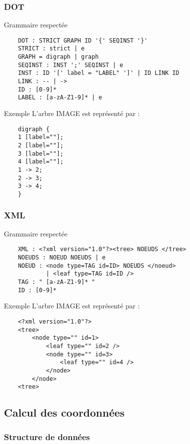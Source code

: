 \begin{frame}
    \frametitle{DOT}
    \begin{block}{Grammaire respectée}
    \begin{verbatim}
    DOT : STRICT GRAPH ID '{' SEQINST '}'
    STRICT : strict | e
    GRAPH = digraph | graph
    SEQINST : INST ';' SEQINST | e
    INST : ID '[' label = "LABEL" ']' | ID LINK ID
    LINK : -- | ->
    ID : [0-9]*
    LABEL : [a-zA-Z1-9]* | e
    \end{verbatim}
    \end{block}
    \begin{exampleblock}{Exemple}
    L'arbre IMAGE est représenté par :
    \begin{verbatim}
    digraph {
    1 [label=""];
    2 [label=""];
    3 [label=""];
    4 [label=""];
    1 -> 2;
    2 -> 3;
    3 -> 4;
    }
    \end{verbatim}
    \end{exampleblock}
\end{frame}

\begin{frame}
    \frametitle{XML}
    \begin{block}{Grammaire respectée}
    \begin{verbatim}
    XML : <?xml version="1.0"?><tree> NOEUDS </tree>
    NOEUDS : NOEUD NOEUDS | e
    NOEUD : <node type=TAG id=ID> NOEUDS </noeud>
            | <leaf type=TAG id=ID />
    TAG : " [a-zA-Z1-9]* "
    ID : [0-9]*
    \end{verbatim}
    \end{block}
    \begin{exampleblock}{Exemple}
    L'arbre IMAGE est représenté par :
    \begin{verbatim}
    <?xml version="1.0"?>
    <tree>
        <node type="" id=1>
            <leaf type="" id=2 />
            <node type="" id=3>
                <leaf type="" id=4 />
            </node>
    	</node>
    <tree>
    \end{verbatim}
    \end{exampleblock}
\end{frame}

\subsection{Calcul des coordonnées}

\begin{frame}
	\frametitle{Structure de données}
	
\end{frame}

